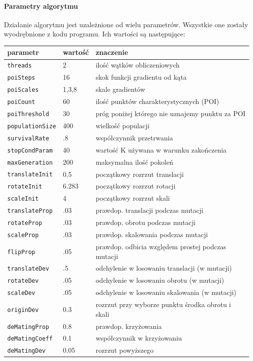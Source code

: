 \documentclass[a4paper,12pt,leqno]{article}
\begin{document}
\paragraph{Parametry algorytmu}
Działanie algorytmu jest uzależnione od wielu parametrów. Wszystkie one zostały wyodrębnione z kodu programu.
Ich wartości są następujące:\\[1em]
\begin{minipage}{\textwidth}\centering
\begin{tabular}{l|l|l}
parametr                & wartość & znaczenie \\
\hline
\texttt{threads}        & 2     & ilość wątków obliczeniowych\\
\hline
\texttt{poiSteps}       & 16    & skok funkcji gradientu od kąta \\
\texttt{poiScales}      & 1,3,8 & skale gradientów \\
\texttt{poiCount}       & 60    & ilość punktów charakterystycznych (POI) \\
\texttt{poiThreshold}   & 30    & próg poniżej którego nie uznajemy punktu za POI \\
\hline
\texttt{populationSize} & 400   & wielkość populacji \\
\texttt{survivalRate}   & .8    & współczynnik przetrwania \\
\texttt{stopCondParam}  & 40    & wartość K używana w warunku zakończenia \\
\texttt{maxGeneration}  & 200   & maksymalna ilość pokoleń \\
\hline
\texttt{translateInit}  & 0.5   & początkowy rozrzut translacji\\
\texttt{rotateInit}     & 6.283 & początkowy rozrzut rotacji\\
\texttt{scaleInit}      & 4     & początkowy rozrzut skali \\
\hline
\texttt{translateProp}  & .03   & prawdop. translacji podczas mutacji \\
\texttt{rotateProp}     & .03   & prawdop. obrotu podczas mutacji \\
\texttt{scaleProp}      & .03   & prawdop. skalowania podczas mutacji \\
\texttt{flipProp}       & .05   & prawdop. odbicia względem prostej podczas mutacji \\
\hline
\texttt{translateDev}   & .5    & odchylenie w losowaniu translacji (w mutacji) \\
\texttt{rotateDev}      & .05   & odchylenie w losowaniu obrotu (w mutacji) \\
\texttt{scaleDev}       & .05   & odchylenie w losowaniu skalowania (w mutacji) \\
\texttt{originDev}      & 0.3   & rozrzut przy wyborze punktu środka obrotu i skali \\
\hline
\texttt{deMatingProp}   & 0.8   & prawdop. krzyżowania \\
\texttt{deMatingCoeff}  & 0.1   & współczynnik w krzyżowaniu \\
\texttt{deMatingDev}    & 0.05  & rozrzut powyższego \\
\end{tabular}
\end{minipage}
\end{document}
